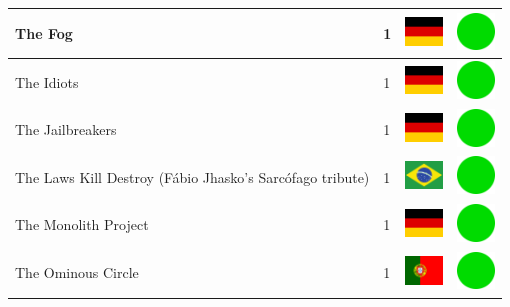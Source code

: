 \documentclass[12pt, a4paper, twoside]{report}
\begin{document}
\begin{center}
\begin{longtable}{|p{5cm}|p{2cm}|p{2cm}|p{2cm}|}
			The Fog & 1 & \includegraphics[width=1cm]{4x3/de} & \includegraphics[width=1cm]{likes/y} \\ \hline
			The Idiots & 1 & \includegraphics[width=1cm]{4x3/de} & \includegraphics[width=1cm]{likes/y} \\ \hline
			The Jailbreakers & 1 & \includegraphics[width=1cm]{4x3/de} & \includegraphics[width=1cm]{likes/y} \\ \hline
			The Laws Kill Destroy (Fábio Jhasko's Sarcófago tribute) & 1 & \includegraphics[width=1cm]{4x3/br} & \includegraphics[width=1cm]{likes/y} \\ \hline
			The Monolith Project & 1 & \includegraphics[width=1cm]{4x3/de} & \includegraphics[width=1cm]{likes/y} \\ \hline
			The Ominous Circle & 1 & \includegraphics[width=1cm]{4x3/pt} & \includegraphics[width=1cm]{likes/y} \\ \hline

\end{longtable}
\end{center}
\end{document}
